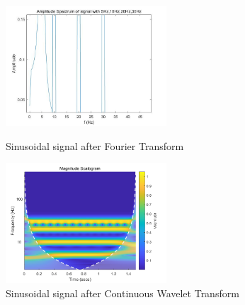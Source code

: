 \begin{figure}[htbp]
\centering
\begin{minipage}[t]{0.48\textwidth}
\centering
\includegraphics[width=6cm]{images/ft_sin.jpg}
\caption{Sinusoidal signal after Fourier Transform}
\label{fig:sin_tf}
\end{minipage}
\begin{minipage}[t]{0.48\textwidth}
\centering
\includegraphics[width=6cm]{images/dwt_sin.png}
\caption{Sinusoidal signal after Continuous Wavelet Transform}
\label{fig:sin_cwt}
\end{minipage}
\end{figure}



